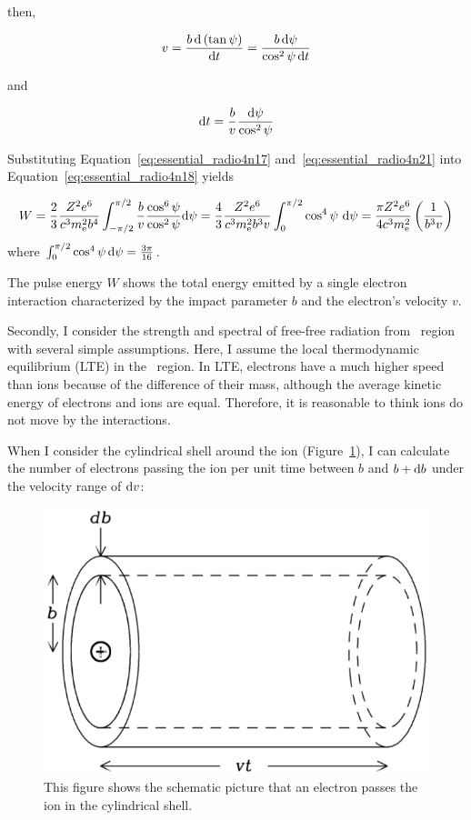 then,

\begin{equation}\label{eq:essential_radio4n20}
    v=\frac{b\,\mathrm{d}\left(\tan \psi\right)}{\mathrm{d} t} = \frac{b\,\mathrm{d} \psi}{\cos ^{2}\psi\,\mathrm{d} t}
\end{equation}

and

\begin{equation}\label{eq:essential_radio4n21}
    \mathrm{d} t=\frac{b}{v} \frac{\mathrm{d} \psi}{\cos ^{2} \psi}
\end{equation}

Substituting Equation~\ref{eq:essential_radio4n17} and~\ref{eq:essential_radio4n21} into Equation~\ref{eq:essential_radio4n18} yields

\begin{equation}\label{eq:essential_radio4n22}
    W=\frac{2}{3} \frac{Z^{2} e^{6}}{c^{3} m_{\mathrm{e}}^{2} b^{4}} \int_{-\pi / 2}^{\pi / 2} \frac{b}{v} \frac{\cos ^{6} \psi}{\cos ^{2} \psi} \mathrm{d} \psi=\frac{4}{3} \frac{Z^{2} e^{6}}{c^{3} m_{\mathrm{e}}^{2} b^{3} v} \int_{0}^{\pi / 2} \cos ^{4} \psi\ \mathrm{d} \psi = \frac{\pi Z^2 e^6}{4 c^3 m_{\mathrm{e}}^2}\left(\frac{1}{b^3v}\right)
\end{equation}
where $\int_{0}^{\pi / 2} \cos ^{4} \psi\,\mathrm{d} \psi=\frac{3 \pi}{16}$.

The pulse energy $W$ shows the total energy emitted by a single electron interaction characterized by the impact parameter $b$ and the electron's velocity $v$.\\ \vspace{0.2cm}

Secondly, I consider the strength and spectral of free-free radiation from \ih~region with several simple assumptions.
Here, I assume the local thermodynamic equilibrium (LTE) in the \ih~region.
In LTE, electrons have a much higher speed than ions because of the difference of their mass, although the average kinetic energy of electrons and ions are equal.
Therefore, it is reasonable to think ions do not move by the interactions.

When I consider the cylindrical shell around the ion (Figure~\ref{fig:nrao_radio4n5}), I can calculate the number of electrons passing the ion per unit time between $b$ and $b + \mathrm{d} b$ under the velocity range of $\mathrm{d} v$:

\begin{figure}[htbp]
	\centering
	\includegraphics[width=.6\linewidth]{Chapter_2/Figures/NRAO_radio4n5.png}
    \caption[The schematic picuture of the cylindrical shell of electrons]{\label{fig:nrao_radio4n5}
        This figure shows the schematic picture that an electron passes the ion in the cylindrical shell.
    }
\end{figure}

